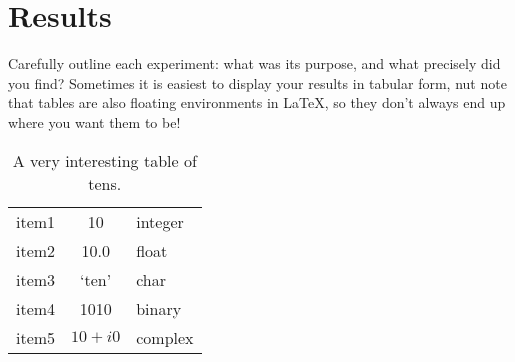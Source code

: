 \section{Results}

Carefully outline each experiment: what was its purpose, and what
precisely did you find? Sometimes it is easiest to display your
results in tabular form, nut note that tables are also floating
environments in \LaTeX\/, so they don't always end up where you want
them to be!

\begin{table}[htbp]
\caption{A very interesting table of tens.}
\begin{center}
\begin{tabular}{|l|c|l|} \hline
item1 & 10 & integer \\
item2 & 10.0 & float \\
item3 & `ten' & char \\
item4 & 1010 & binary \\
item5 & $10 + i0$ & complex \\
\hline
\end{tabular}
\end{center}
\end{table}

